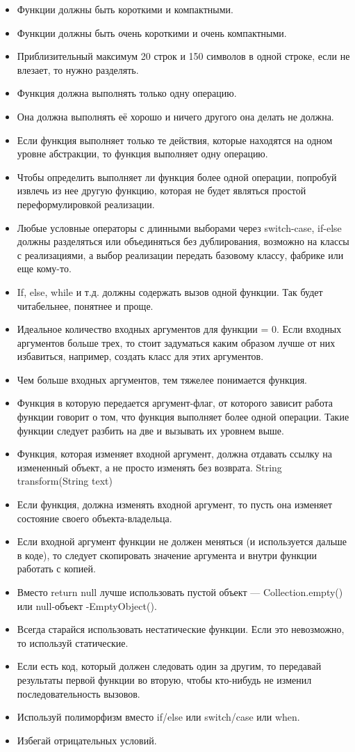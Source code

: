 \begin{itemize}
	\item Функции должны быть короткими и компактными.
	\item Функции должны быть очень короткими и очень компактными.
	\item Приблизительный максимум 20 строк и 150 символов в одной строке, если не влезает, то нужно разделять.
	\item Функция должна выполнять только одну операцию.
	\item Она должна выполнять её хорошо и ничего другого она делать не должна.
	\item Если функция выполняет только те действия, которые находятся на одном уровне абстракции, то функция выполняет одну операцию.
	\item Чтобы определить выполняет ли функция более одной операции, попробуй извлечь из нее другую функцию, которая не будет являться простой переформулировкой реализации.
	\item Любые условные операторы с длинными выборами через switch-case, if-else должны разделяться или объединяться без дублирования, возможно на классы с реализациями, а выбор реализации передать базовому классу, фабрике или еще кому-то.
	\item If, else, while и т.д. должны содержать вызов одной функции. Так будет читабельнее, понятнее и проще.
	\item Идеальное количество входных аргументов для функции = 0. Если входных аргументов больше трех, то стоит задуматься каким образом лучше от них избавиться, например, создать класс для этих аргументов.
	\item Чем больше входных аргументов, тем тяжелее понимается функция.
	\item Функция в которую передается аргумент-флаг, от которого зависит работа функции говорит о том, что функция выполняет более одной операции. Такие функции следует разбить на две и вызывать их уровнем выше.
	\item Функция, которая изменяет входной аргумент, должна отдавать ссылку на измененный объект, а не просто изменять без возврата. String transform(String text)
	\item Если функция, должна изменять входной аргумент, то пусть она изменяет состояние своего объекта-владельца.
	\item Если входной аргумент функции не должен меняться (и используется дальше в коде), то следует скопировать значение аргумента и внутри функции работать с копией.
	\item Вместо return null лучше использовать пустой объект — Collection.empty() или null-объект -EmptyObject().
	\item Всегда старайся использовать нестатические функции. Если это невозможно, то используй статические.
	\item Если есть код, который должен следовать один за другим, то передавай результаты первой функции во вторую, чтобы кто-нибудь не изменил последовательность вызовов.
	\item Используй полиморфизм вместо if/else или switch/case или when.
	\item Избегай отрицательных условий.
\end{itemize}

